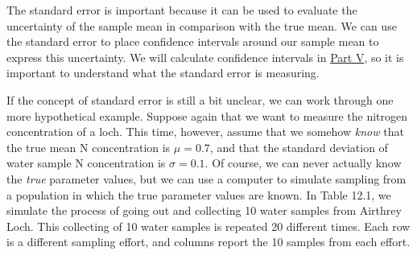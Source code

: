 \documentclass[
  openany]{scrbook}
\begin{document}
The standard error is important because it can be used to evaluate the uncertainty of the sample mean in comparison with the true mean.
We can use the standard error to place confidence intervals around our sample mean to express this uncertainty.
We will calculate confidence intervals in \protect\hyperlink{Week5}{Part V}, so it is important to understand what the standard error is measuring.

If the concept of standard error is still a bit unclear, we can work through one more hypothetical example.
Suppose again that we want to measure the nitrogen concentration of a loch.
This time, however, assume that we somehow \emph{know} that the true mean N concentration is \(\mu = 0.7\), and that the standard deviation of water sample N concentration is \(\sigma = 0.1\).
Of course, we can never actually know the \emph{true} parameter values, but we can use a computer to simulate sampling from a population in which the true parameter values are known.
In Table 12.1, we simulate the process of going out and collecting 10 water samples from Airthrey Loch.
This collecting of 10 water samples is repeated 20 different times.
Each row is a different sampling effort, and columns report the 10 samples from each effort.
\end{document}
